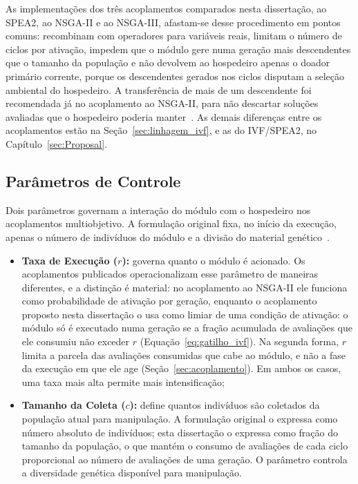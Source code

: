 As implementações dos três acoplamentos comparados nesta dissertação, ao SPEA2, ao NSGA-II e ao NSGA-III, afastam-se desse procedimento em pontos comuns: recombinam com operadores para variáveis reais, limitam o número de ciclos por ativação, impedem que o módulo gere numa geração mais descendentes que o tamanho da população e não devolvem ao hospedeiro apenas o doador primário corrente, porque os descendentes gerados nos ciclos disputam a seleção ambiental do hospedeiro. A transferência de mais de um descendente foi recomendada já no acoplamento ao NSGA-II, para não descartar soluções avaliadas que o hospedeiro poderia manter~\cite{sampaio2017ivf}. As demais diferenças entre os acoplamentos estão na Seção~\ref{sec:linhagem_ivf}, e as do IVF/SPEA2, no Capítulo~\ref{sec:Proposal}.

\subsection{Parâmetros de Controle}

Dois parâmetros governam a interação do módulo com o hospedeiro nos acoplamentos multiobjetivo. A formulação original fixa, no início da execução, apenas o número de indivíduos do módulo e a divisão do material genético~\cite{camilo-junior2011}.

\begin{itemize}
    \item \textbf{Taxa de Execução ($r$):} governa quanto o módulo é acionado. Os acoplamentos publicados operacionalizam esse parâmetro de maneiras diferentes, e a distinção é material: no acoplamento ao NSGA-II ele funciona como probabilidade de ativação por geração, enquanto o acoplamento proposto nesta dissertação o usa como limiar de uma condição de ativação: o módulo só é executado numa geração se a fração acumulada de avaliações que ele consumiu não exceder $r$ (Equação~\ref{eq:gatilho_ivf}). Na segunda forma, $r$ limita a parcela das avaliações consumidas que cabe ao módulo, e não a fase da execução em que ele age (Seção~\ref{sec:acoplamento}). Em ambos os casos, uma taxa mais alta permite mais intensificação;
    
    \item \textbf{Tamanho da Coleta ($c$):} define quantos indivíduos são coletados da população atual para manipulação. A formulação original o expressa como número absoluto de indivíduos; esta dissertação o expressa como fração do tamanho da população, o que mantém o consumo de avaliações de cada ciclo proporcional ao número de avaliações de uma geração. O parâmetro controla a diversidade genética disponível para manipulação.
\end{itemize}

